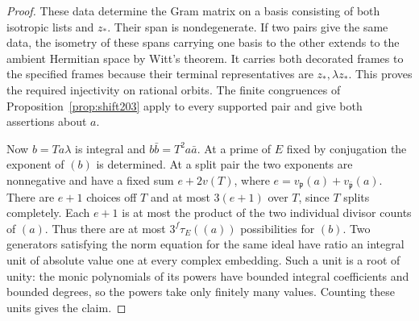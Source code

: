 \documentclass[a4paper,11pt]{article}
\theoremstyle{definition}
\theoremstyle{remark}
\numberwithin{equation}{section}
\begin{document}
\begin{proof}
These data determine the Gram matrix on a basis consisting of
both isotropic lists and \(z_*\). Their span is nondegenerate.
If two pairs give the same data, the isometry of these spans
carrying one basis to the other extends to the ambient Hermitian
space by Witt's theorem. It carries both decorated frames to the
specified frames because their terminal representatives are
\(z_*,\lambda z_*\). This proves the required injectivity on
rational orbits. The finite congruences of
Proposition~\ref{prop:shift203} apply to every supported pair
and give both assertions about \(a\).

Now \(b=Ta\lambda\) is integral and \(b\bar b=T^2a\bar a\).
At a prime of \(E\) fixed by conjugation the exponent of
\((b)\) is determined. At a split pair the two exponents are
nonnegative and have a fixed sum \(e+2v(T)\), where
\(e=v_{\mathfrak p}(a)+v_{\bar{\mathfrak p}}(a)\).
There are \(e+1\) choices off \(T\) and at most \(3(e+1)\)
over \(T\), since \(T\) splits completely. Each \(e+1\) is
at most the product of the two individual divisor counts of
\((a)\). Thus there are at most \(3^f\tau_E((a))\) possibilities
for \((b)\). Two generators satisfying the norm equation for
the same ideal have ratio an integral unit of absolute value
one at every complex embedding. Such a unit is a root of
unity: the monic polynomials of its powers have bounded
integral coefficients and bounded degrees, so the powers take
only finitely many values. Counting these units gives the claim.
\end{proof}
\end{document}
